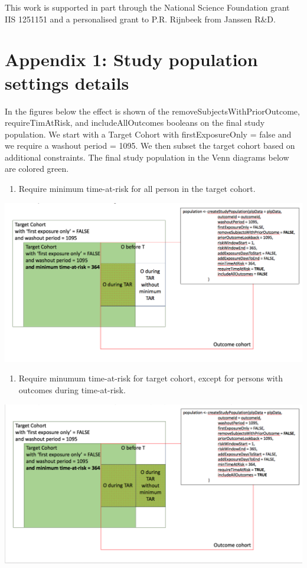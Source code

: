 \documentclass[]{book}
\providecommand{\tightlist}{%
  \setlength{\itemsep}{0pt}\setlength{\parskip}{0pt}}
\begin{document}
This work is supported in part through the National Science Foundation
grant IIS 1251151 and a personalised grant to P.R. Rijnbeek from Janssen
R\&D.

\newpage

\section*{Appendix 1: Study population settings
details}\label{appendix-1-study-population-settings-details}

In the figures below the effect is shown of the
removeSubjectsWithPriorOutcome, requireTimAtRisk, and includeAllOutcomes
booleans on the final study population. We start with a Target Cohort
with firstExposureOnly = false and we require a washout period = 1095.
We then subset the target cohort based on additional constraints. The
final study population in the Venn diagrams below are colored green.

\begin{enumerate}
\def\labelenumi{\arabic{enumi}.}
\tightlist
\item
  Require minimum time-at-risk for all person in the target cohort.
\end{enumerate}

\includegraphics{images/PatientLevelPrediction/popdef1.png}

\begin{enumerate}
\def\labelenumi{\arabic{enumi}.}
\setcounter{enumi}{1}
\tightlist
\item
  Require minumum time-at-risk for target cohort, except for persons
  with outcomes during time-at-risk.
\end{enumerate}

\includegraphics{images/PatientLevelPrediction/popdef2.png}
\end{document}
